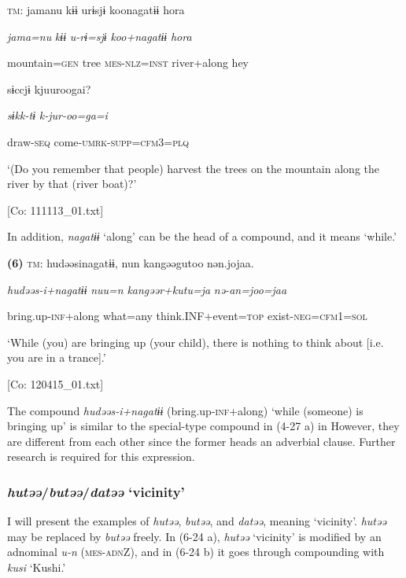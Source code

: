     \textsc{tm}:  jamanu  kɨɨ  urɨsjɨ  koonagatɨɨ  {\textbar}hora{\textbar}

      \textit{jama=nu}  \textit{kɨɨ}  \textit{u-rɨ=sjɨ}  \textit{koo+nagatɨɨ}  \textit{hora}

      mountain=\textsc{gen}  tree  \textsc{mes}-\textsc{nlz}=\textsc{inst}  river+along  hey

      sɨccjɨ  kjuuroogai?

      \textit{sɨkk-tɨ}  \textit{k-jur-oo=ga=i}

      draw-\textsc{seq}  come-\textsc{umrk}-\textsc{supp}=\textsc{cfm}3=\textsc{plq}

      ‘(Do you remember that people) harvest the trees on the mountain along the river by that (river boat)?’

      [Co: 111113\_01.txt]

In addition, \textit{nagatɨɨ} ‘along’ can be the head of a compound, and it means ‘while.’

\textbf{(6)}  \textsc{tm}:  hudəəsinagatɨɨ,  nun  kangəəgutoo  nən.jojaa.

    \textit{hudəəs-i+nagatɨɨ}  \textit{nuu=n}  \textit{kangəər+kutu=ja}  \textit{nə-an=joo=jaa}

    bring.up-\textsc{inf}+along  what=any  think.INF+event=\textsc{top}  exist-\textsc{neg}=\textsc{cfm}1=\textsc{sol}

    ‘While (you) are bringing up (your child), there is nothing to think about [i.e. you are in a trance].’

    [Co: 120415\_01.txt]

The compound \textit{hudəəs-i+nagatɨɨ} (bring.up-\textsc{inf}+along) ‘while (someone) is bringing up’ is similar to the special-type compound in (4-27 a) in  However, they are different from each other since the former heads an adverbial clause. Further research is required for this expression.

\subsubsection{\textit{hutəə}/\textit{butəə}/\textit{datəə} ‘vicinity’}

I will present the examples of \textit{hutəə}, \textit{butəə}, and \textit{datəə}, meaning ‘vicinity’. \textit{hutəə} may be replaced by \textit{butəə} freely. In (6-24 a), \textit{hutəə} ‘vicinity’ is modified by an adnominal \textit{u-n} (\textsc{mes}-\textsc{adn}Z), and in (6-24 b) it goes through compounding with \textit{kusi} ‘Kushi.’

